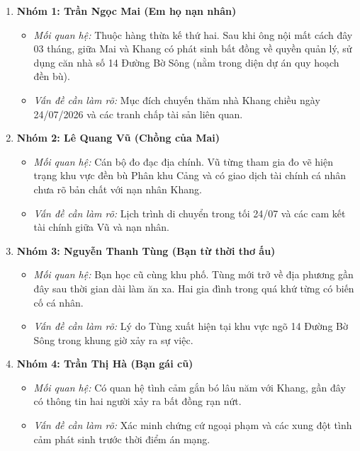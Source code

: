 \documentclass[12pt,a4paper]{article}
\begin{document}
\begin{enumerate}[label=\arabic*., leftmargin=1.5cm]
    \item \textbf{Nhóm 1: Trần Ngọc Mai (Em họ nạn nhân)}
    \begin{itemize}[leftmargin=0.8cm]
        \item \textit{Mối quan hệ:} Thuộc hàng thừa kế thứ hai. Sau khi ông nội mất cách đây 03 tháng, giữa Mai và Khang có phát sinh bất đồng về quyền quản lý, sử dụng căn nhà số 14 Đường Bờ Sông (nằm trong diện dự án quy hoạch đền bù).
        \item \textit{Vấn đề cần làm rõ:} Mục đích chuyến thăm nhà Khang chiều ngày 24/07/2026 và các tranh chấp tài sản liên quan.
    \end{itemize}

    \item \textbf{Nhóm 2: Lê Quang Vũ (Chồng của Mai)}
    \begin{itemize}[leftmargin=0.8cm]
        \item \textit{Mối quan hệ:} Cán bộ đo đạc địa chính. Vũ từng tham gia đo vẽ hiện trạng khu vực đền bù Phân khu Cảng và có giao dịch tài chính cá nhân chưa rõ bản chất với nạn nhân Khang.
        \item \textit{Vấn đề cần làm rõ:} Lịch trình di chuyển trong tối 24/07 và các cam kết tài chính giữa Vũ và nạn nhân.
    \end{itemize}

    \item \textbf{Nhóm 3: Nguyễn Thanh Tùng (Bạn từ thời thơ ấu)}
    \begin{itemize}[leftmargin=0.8cm]
        \item \textit{Mối quan hệ:} Bạn học cũ cùng khu phố. Tùng mới trở về địa phương gần đây sau thời gian dài làm ăn xa. Hai gia đình trong quá khứ từng có biến cố cá nhân.
        \item \textit{Vấn đề cần làm rõ:} Lý do Tùng xuất hiện tại khu vực ngõ 14 Đường Bờ Sông trong khung giờ xảy ra sự việc.
    \end{itemize}

    \item \textbf{Nhóm 4: Trần Thị Hà (Bạn gái cũ)}
    \begin{itemize}[leftmargin=0.8cm]
        \item \textit{Mối quan hệ:} Có quan hệ tình cảm gắn bó lâu năm với Khang, gần đây có thông tin hai người xảy ra bất đồng rạn nứt.
        \item \textit{Vấn đề cần làm rõ:} Xác minh chứng cứ ngoại phạm và các xung đột tình cảm phát sinh trước thời điểm án mạng.
    \end{itemize}
\end{enumerate}
\end{document}
